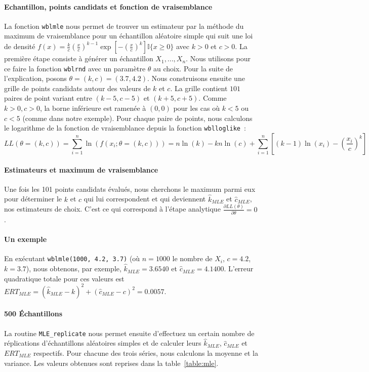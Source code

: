 \paragraph{Echantillon, points candidats et fonction de vraisemblance}
La fonction \texttt{wblmle} nous permet de trouver un estimateur par la méthode du maximum de vraisemblance pour un échantillon aléatoire simple qui suit une loi de densité
$ f(x)= \frac{k}{c} \left(\frac{x}{c}\right)^{k-1} \exp \left[ -\left(\frac{x}{c}\right)^{k}\right] \mathbb{I}\{x \geq 0\}$ avec $k>0$ et $c>0$.
La première étape consiste à générer un échantillon $X_1,...,X_n$. Nous utilisons pour ce faire la fonction \texttt{wblrnd} avec un paramètre  $\theta$ au choix. Pour la suite de l'explication, posons $\theta = (k,c) = (3.7, 4.2)$. Nous construisons ensuite une grille de points candidats autour des valeurs de $k$ et $c$. La grille contient $101$ paires de point variant entre $(k-5, c-5)$ et $(k+5, c+5)$. Comme $k>0, c>0$, la borne inférieure est ramenée à $(0,0)$ pour les cas où $k<5$ ou $c<5$ (comme dans notre exemple). Pour chaque paire de points, nous calculons le logarithme de la fonction de vraisemblance depuis la fonction \texttt{wblloglike}~:
$$LL(\theta=(k,c)) = \sum_{i=1}^{n}{\ln(f(x_i;\theta=(k,c)))} = n\ln(k) - kn\ln(c) + \sum_{i=1}^{n}{\left[(k-1)\ln(x_i) - \left(\frac{x_i}{c}\right)^{k}\right]}$$

\paragraph{Estimateurs et maximum de vraisemblance} Une fois les 101 points candidats évalués, nous cherchons le maximum parmi eux pour déterminer le $k$ et $c$ qui lui correspondent et qui deviennent $\hat{k}_{MLE}$ et $\hat{c}_{MLE}$, nos estimateurs de choix. C'est ce qui correspond à l'étape analytique $\frac{\partial LL(\theta)}{\partial \theta} = 0$.

\paragraph{Un exemple} En exécutant \texttt{wblmle(1000, 4.2, 3.7)} (où $n = 1000$ le nombre de $X_i$, $c = 4.2$, $k = 3.7$), nous obtenons, par exemple, $\hat{k}_{MLE} = 3.6540$ et $\hat{c}_{MLE} = 4.1400$.
L'erreur quadratique totale pour ces valeurs est $ERT_{MLE} = (\hat{k}_{MLE} - k)^2 + (\hat{c}_{MLE} - c)^2 = 0.0057$.

\paragraph{500 \'Echantillons} La routine \texttt{MLE\_replicate} nous permet ensuite d'effectuez un certain nombre de réplications d'échantillons aléatoires simples et de calculer leurs $\hat{k}_{MLE}$, $\hat{c}_{MLE}$ et $ERT_{MLE}$ respectifs. Pour chacune des trois séries, nous calculons la moyenne et la variance. Les valeurs obtenues sont reprises dans la table~\ref{table:mle}.

